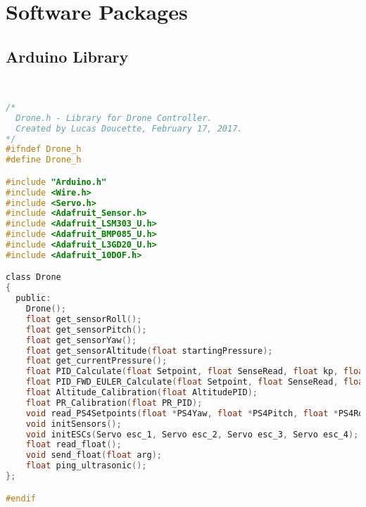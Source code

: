 
\section{Software Packages}

\subsection{Arduino Library}
\lstset{basicstyle=\tiny}
\begin{lstlisting}[language=C,caption={Drone.h Arduino Header File},label={lst:Drone.h}]


/*
  Drone.h - Library for Drone Controller.
  Created by Lucas Doucette, February 17, 2017.
*/
#ifndef Drone_h
#define Drone_h

#include "Arduino.h"
#include <Wire.h>
#include <Servo.h>
#include <Adafruit_Sensor.h>
#include <Adafruit_LSM303_U.h>
#include <Adafruit_BMP085_U.h>
#include <Adafruit_L3GD20_U.h>
#include <Adafruit_10DOF.h>

class Drone
{
  public:
    Drone();
    float get_sensorRoll();
    float get_sensorPitch();
    float get_sensorYaw();
    float get_sensorAltitude(float startingPressure);
    float get_currentPressure();
    float PID_Calculate(float Setpoint, float SenseRead, float kp, float kd, float ki );
    float PID_FWD_EULER_Calculate(float Setpoint, float SenseRead, float kp, float kd, float ki, float Ts, float N);
    float Altitude_Calibration(float AltitudePID);
    float PR_Calibration(float PR_PID);
    void read_PS4Setpoints(float *PS4Yaw, float *PS4Pitch, float *PS4Roll, float *PS4Altitude);
    void initSensors();
    void initESCs(Servo esc_1, Servo esc_2, Servo esc_3, Servo esc_4);
    float read_float();
    void send_float(float arg);
    float ping_ultrasonic();
};

#endif

\end{lstlisting}



\newpage



